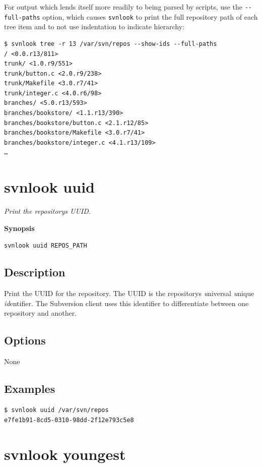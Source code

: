For output which lends itself more readily to being parsed by scripts,
use the \texttt{-\/-full-paths} option, which causes \texttt{svnlook} to
print the full repository path of each tree item and to not use
indentation to indicate hierarchy:

\begin{verbatim}
$ svnlook tree -r 13 /var/svn/repos --show-ids --full-paths
/ <0.0.r13/811>
trunk/ <1.0.r9/551>
trunk/button.c <2.0.r9/238>
trunk/Makefile <3.0.r7/41>
trunk/integer.c <4.0.r6/98>
branches/ <5.0.r13/593>
branches/bookstore/ <1.1.r13/390>
branches/bookstore/button.c <2.1.r12/85>
branches/bookstore/Makefile <3.0.r7/41>
branches/bookstore/integer.c <4.1.r13/109>
…
\end{verbatim}

\section{svnlook uuid}\label{svn.ref.svnlook.c.uuid}

\emph{Print the repository\textquotesingle s UUID.}

\textbf{Synopsis}

\texttt{svnlook\ uuid\ REPOS\_PATH}

\subsection{Description}

Print the UUID for the repository. The UUID is the
repository\textquotesingle s \emph{u}niversal \emph{u}nique
\emph{id}entifier. The Subversion client uses this identifier to
differentiate between one repository and another.

\subsection{Options}

None

\subsection{Examples}

\begin{verbatim}
$ svnlook uuid /var/svn/repos
e7fe1b91-8cd5-0310-98dd-2f12e793c5e8
\end{verbatim}

\section{svnlook youngest}\label{svn.ref.svnlook.c.youngest}

